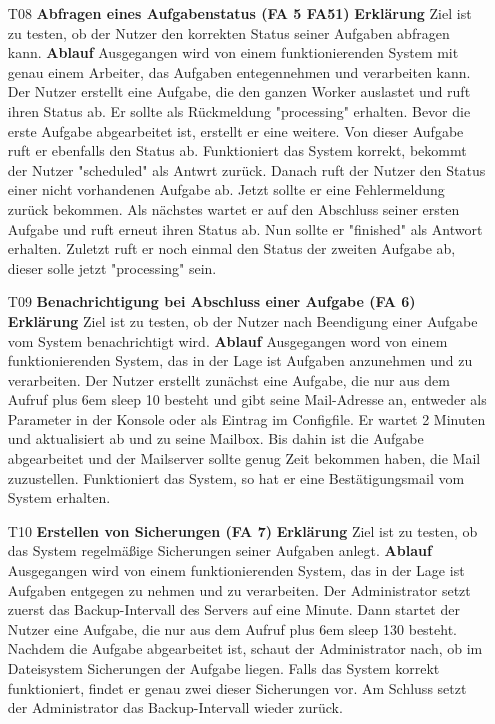 \documentclass[a4paper,12pt]{article}
\makeatletter
\newenvironment{mycode}
 {\def\@xobeysp{\ }\verbatim\rightskip=0pt plus 6em\relax}
 {\endverbatim}
\makeatother
\begin{document}
\begin{itemize}
\item[T08] \textbf{Abfragen eines Aufgabenstatus (FA 5 FA51)}
\subitem \textbf{Erklärung} Ziel ist zu testen, ob der Nutzer den korrekten Status seiner Aufgaben abfragen kann.
\subitem \textbf{Ablauf} Ausgegangen wird von einem funktionierenden System mit genau einem Arbeiter, das Aufgaben entegennehmen und verarbeiten kann.
Der Nutzer erstellt eine Aufgabe, die den ganzen Worker auslastet und ruft ihren Status ab. Er sollte als Rückmeldung "processing" erhalten. Bevor die erste Aufgabe abgearbeitet ist, erstellt er eine weitere.
Von dieser Aufgabe ruft er ebenfalls den Status ab. Funktioniert das System korrekt, bekommt der Nutzer "scheduled" als Antwrt zurück.
Danach ruft der Nutzer den Status einer nicht vorhandenen Aufgabe ab. Jetzt sollte er eine Fehlermeldung zurück bekommen.
Als nächstes wartet er auf den Abschluss seiner ersten Aufgabe und ruft erneut ihren Status ab. Nun sollte er "finished" als Antwort erhalten.
Zuletzt ruft er noch einmal den Status der zweiten Aufgabe ab, dieser solle jetzt "processing" sein.

\item[T09] \textbf{Benachrichtigung bei Abschluss einer Aufgabe (FA 6)}
\subitem \textbf{Erklärung} Ziel ist zu testen, ob der Nutzer nach Beendigung einer Aufgabe vom System benachrichtigt wird.
\subitem \textbf{Ablauf} Ausgegangen word von einem funktionierenden System, das in der Lage ist Aufgaben anzunehmen und zu verarbeiten.
Der Nutzer erstellt zunächst eine Aufgabe, die nur aus dem Aufruf
\begin{mycode}
sleep 10
\end{mycode}
besteht und gibt seine Mail-Adresse an, entweder als Parameter in der Konsole oder als Eintrag im \gls{Configfile}.
Er wartet 2 Minuten und aktualisiert ab und zu seine Mailbox. Bis dahin ist die Aufgabe abgearbeitet und der Mailserver sollte genug Zeit bekommen haben, die Mail zuzustellen.
Funktioniert das System, so hat er eine Bestätigungsmail vom System erhalten.

\item[T10] \textbf{Erstellen von Sicherungen (FA 7)}
\subitem \textbf{Erklärung} Ziel ist zu testen, ob das System regelmäßige Sicherungen seiner Aufgaben anlegt.
\subitem \textbf{Ablauf} Ausgegangen wird von einem funktionierenden System, das in der Lage ist Aufgaben entgegen zu nehmen und zu verarbeiten.
Der Administrator setzt zuerst das Backup-Intervall des Servers auf eine Minute.
Dann startet der Nutzer eine Aufgabe, die nur aus dem Aufruf
\begin{mycode}
sleep 130
\end{mycode}
besteht. Nachdem die Aufgabe abgearbeitet ist, schaut der Administrator nach, ob im Dateisystem Sicherungen der Aufgabe liegen.
Falls das System korrekt funktioniert, findet er genau zwei dieser Sicherungen vor.
Am Schluss setzt der Administrator das Backup-Intervall wieder zurück.


\end{itemize}
\end{document}
